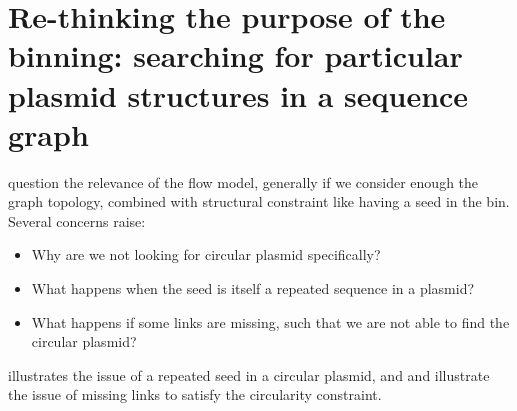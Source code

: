 \section{Re-thinking the purpose of the binning: searching for particular plasmid structures in a sequence graph}\label{sec:plasmid_structures}

 question the relevance of the flow model, generally if we consider enough the graph topology, combined with structural constraint like having a seed in the bin.
Several concerns raise:

\begin{itemize}
  \item Why are we not looking for circular plasmid specifically?
  \item What happens when the seed is itself a repeated sequence in a plasmid?
  \item What happens if some links are missing, such that we are not able to find the circular plasmid?
\end{itemize}

 illustrates the issue of a repeated seed in a circular plasmid, and  and  illustrate the issue of missing links to satisfy the circularity constraint.

